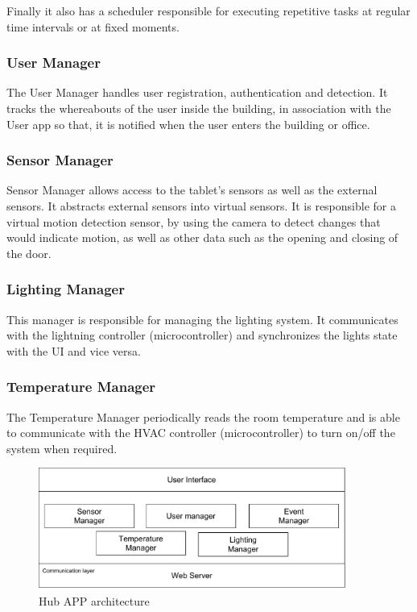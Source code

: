 Finally it also has a scheduler responsible for executing repetitive tasks at regular time intervals or at fixed moments.


\subsubsection{User Manager}
The User Manager handles user registration, authentication and detection. It tracks the whereabouts of the user inside the building, in association with the User app so that, it is notified when the user enters the building or office.


\subsubsection{Sensor Manager}
Sensor Manager allows access to the tablet's sensors as well as the external sensors. It abstracts external sensors into virtual sensors. It is responsible for a virtual motion detection sensor, by using the camera to detect changes that would indicate motion, as well as other data such as the opening and closing of the door.


\subsubsection{Lighting Manager}

This manager is responsible for managing the lighting system. It communicates with the lightning controller (microcontroller) and synchronizes the lights state with the \ac{UI} and vice versa.

\subsubsection{Temperature Manager}

The Temperature Manager periodically reads the room temperature and is able to communicate with the \ac{HVAC} controller (microcontroller) to turn on/off the system when required.


\begin{figure}[h]
\centering
\includegraphics[width=0.9\textwidth]{Figures/software_hub}
\caption{Hub APP architecture }
\label{software2}
\end{figure}



